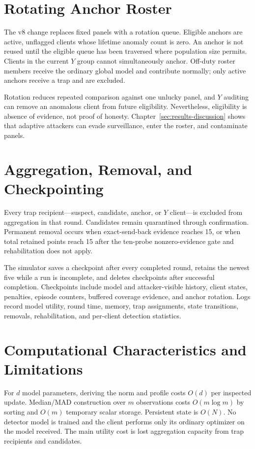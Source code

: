 \section{Rotating Anchor Roster}

The v8 change replaces fixed panels with a rotation queue. Eligible anchors are active, unflagged clients whose lifetime anomaly count is zero. An anchor is not reused until the eligible queue has been traversed where population size permits. Clients in the current $Y$ group cannot simultaneously anchor. Off-duty roster members receive the ordinary global model and contribute normally; only active anchors receive a trap and are excluded.

Rotation reduces repeated comparison against one unlucky panel, and $Y$ auditing can remove an anomalous client from future eligibility. Nevertheless, eligibility is absence of evidence, not proof of honesty. Chapter~\ref{sec:results-discussion} shows that adaptive attackers can evade surveillance, enter the roster, and contaminate panels.

\section{Aggregation, Removal, and Checkpointing}

Every trap recipient---suspect, candidate, anchor, or $Y$ client---is excluded from aggregation in that round. Candidates remain quarantined through confirmation. Permanent removal occurs when exact-send-back evidence reaches 15, or when total retained points reach 15 after the ten-probe nonzero-evidence gate and rehabilitation does not apply.

The simulator saves a checkpoint after every completed round, retains the newest five while a run is incomplete, and deletes checkpoints after successful completion. Checkpoints include model and attacker-visible history, client states, penalties, episode counters, buffered coverage evidence, and anchor rotation. Logs record model utility, round time, memory, trap assignments, state transitions, removals, rehabilitation, and per-client detection statistics.

\section{Computational Characteristics and Limitations}

For $d$ model parameters, deriving the norm and profile costs $O(d)$ per inspected update. Median/MAD construction over $m$ observations costs $O(m\log m)$ by sorting and $O(m)$ temporary scalar storage. Persistent state is $O(N)$. No detector model is trained and the client performs only its ordinary optimizer on the model received. The main utility cost is lost aggregation capacity from trap recipients and candidates.

